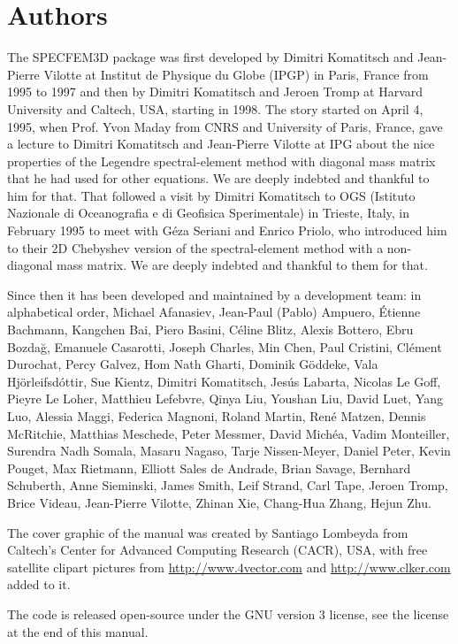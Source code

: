 \section*{Authors}

\noindent The SPECFEM3D package was first developed by Dimitri
Komatitsch and Jean-Pierre Vilotte at Institut de Physique du Globe
(IPGP) in Paris, France from 1995 to 1997 and then by Dimitri Komatitsch
and Jeroen Tromp at Harvard University and Caltech, USA, starting in 1998.
The story started on April 4, 1995, when Prof. Yvon Maday from CNRS and University of Paris, France, gave a lecture to
Dimitri Komatitsch and Jean-Pierre Vilotte at IPG about the nice properties of the Legendre spectral-element method with diagonal mass matrix that he had used for
other equations. We are deeply indebted and thankful to him for that.
That followed a visit by Dimitri Komatitsch to OGS (Istituto Nazionale di Oceanografia e di Geofisica Sperimentale) in Trieste, Italy, in February 1995
to meet with G\'eza Seriani and Enrico Priolo, who introduced him to their 2D Chebyshev version of the spectral-element method with a non-diagonal mass matrix.
We are deeply indebted and thankful to them for that.

Since then it has been developed and maintained by a development team: in alphabetical order,
Michael Afanasiev,
Jean-Paul (Pablo) Ampuero,
\'Etienne Bachmann,
Kangchen Bai,
Piero Basini,
C\'eline Blitz,
Alexis Bottero,
Ebru Bozda\u{g},
Emanuele Casarotti,
Joseph Charles,
Min Chen,
Paul Cristini,
Cl\'ement Durochat,
Percy Galvez,
Hom Nath Gharti,
Dominik G\"oddeke,
Vala Hj\"orleifsd\'ottir,
Sue Kientz,
Dimitri Komatitsch,
Jes\'us Labarta,
Nicolas Le Goff,
Pieyre Le Loher,
Matthieu Lefebvre,
Qinya Liu,
Youshan Liu,
David Luet,
Yang Luo,
Alessia Maggi,
Federica Magnoni,
Roland Martin,
Ren\'e Matzen,
Dennis McRitchie,
Matthias Meschede,
Peter Messmer,
David Mich\'ea,
Vadim Monteiller,
Surendra Nadh Somala,
Masaru Nagaso,
Tarje Nissen-Meyer,
Daniel Peter,
Kevin Pouget,
Max Rietmann,
Elliott Sales de Andrade,
Brian Savage,
Bernhard Schuberth,
Anne Sieminski,
James Smith,
Leif Strand,
Carl Tape,
Jeroen Tromp,
Brice Videau,
Jean-Pierre Vilotte,
Zhinan Xie,
Chang-Hua Zhang,
Hejun Zhu.\newline

The cover graphic of the manual was created by Santiago Lombeyda from
Caltech's Center for Advanced Computing Research (CACR), USA, with free satellite clipart pictures
from \url{http://www.4vector.com} and \url{http://www.clker.com} added to it.\newline

The code is released open-source under the GNU version 3 license, see the license at the end of this manual.\newline


